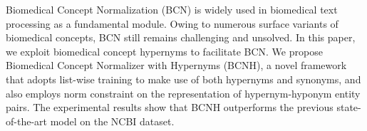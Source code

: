 Biomedical Concept Normalization (BCN) is widely used in biomedical text processing as a fundamental module. Owing to numerous surface variants of biomedical concepts, BCN still remains challenging and unsolved. In this paper, we exploit biomedical concept hypernyms to facilitate BCN. We propose Biomedical Concept Normalizer with Hypernyms (BCNH), a novel framework that adopts list-wise training to make use of both hypernyms and synonyms, and also employs norm constraint on the representation of hypernym-hyponym entity pairs. The experimental results show that BCNH outperforms the previous state-of-the-art model on the NCBI dataset.
